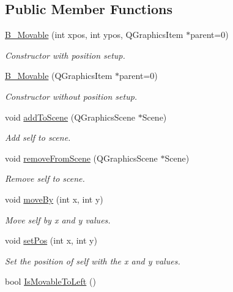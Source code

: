\subsection*{Public Member Functions}
\begin{DoxyCompactItemize}
\item 
\hyperlink{class_b___movable_ac874fc12d19502117d0bfc396d1059d2}{B\+\_\+\+Movable} (int xpos, int ypos, Q\+Graphics\+Item $\ast$parent=0)
\begin{DoxyCompactList}\small\item\em Constructor with position setup. \end{DoxyCompactList}\item 
\hyperlink{class_b___movable_aef88fa8933731c08731796a9ee3fda6b}{B\+\_\+\+Movable} (Q\+Graphics\+Item $\ast$parent=0)
\begin{DoxyCompactList}\small\item\em Constructor without position setup. \end{DoxyCompactList}\item 
void \hyperlink{class_b___movable_a8a23ac4b1692d95607dcccd6d6c9a973}{add\+To\+Scene} (Q\+Graphics\+Scene $\ast$Scene)
\begin{DoxyCompactList}\small\item\em Add self to scene. \end{DoxyCompactList}\item 
void \hyperlink{class_b___movable_aa4d26e877655021ef70bc6914fe04418}{remove\+From\+Scene} (Q\+Graphics\+Scene $\ast$Scene)
\begin{DoxyCompactList}\small\item\em Remove self to scene. \end{DoxyCompactList}\item 
void \hyperlink{class_b___movable_a55fb8069fc55c4edabd2ac076acdee17}{move\+By} (int x, int y)
\begin{DoxyCompactList}\small\item\em Move self by x and y values. \end{DoxyCompactList}\item 
void \hyperlink{class_b___movable_aca717ec608426940422f1bc658201bf5}{set\+Pos} (int x, int y)
\begin{DoxyCompactList}\small\item\em Set the position of self with the x and y values. \end{DoxyCompactList}\item 
bool \hyperlink{class_b___movable_a96a0a18c27314600a19d467b6f7820a3}{Is\+Movable\+To\+Left} ()

\end{DoxyCompactItemize}
